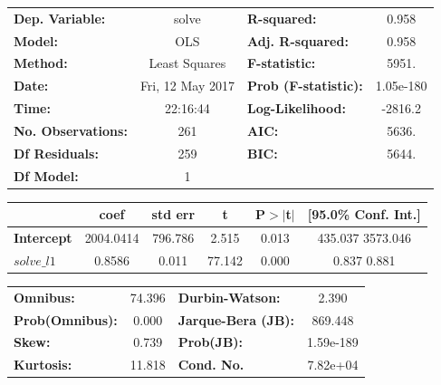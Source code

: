 \documentclass{article}
\begin{document}
\begin{center}
\begin{tabular}{lclc}
\toprule
\textbf{Dep. Variable:}    &      solve       & \textbf{  R-squared:         } &     0.958   \\
\textbf{Model:}            &       OLS        & \textbf{  Adj. R-squared:    } &     0.958   \\
\textbf{Method:}           &  Least Squares   & \textbf{  F-statistic:       } &     5951.   \\
\textbf{Date:}             & Fri, 12 May 2017 & \textbf{  Prob (F-statistic):} & 1.05e-180   \\
\textbf{Time:}             &     22:16:44     & \textbf{  Log-Likelihood:    } &   -2816.2   \\
\textbf{No. Observations:} &         261      & \textbf{  AIC:               } &     5636.   \\
\textbf{Df Residuals:}     &         259      & \textbf{  BIC:               } &     5644.   \\
\textbf{Df Model:}         &           1      & \textbf{                     } &             \\
\bottomrule
\end{tabular}
\begin{tabular}{lccccc}
                   & \textbf{coef} & \textbf{std err} & \textbf{t} & \textbf{P$>$$|$t$|$} & \textbf{[95.0\% Conf. Int.]}  \\
\midrule
\textbf{Intercept} &    2004.0414  &      796.786     &     2.515  &         0.013        &       435.037  3573.046       \\
\textbf{$solve\_l1$}  &       0.8586  &        0.011     &    77.142  &         0.000        &         0.837     0.881       \\
\bottomrule
\end{tabular}
\begin{tabular}{lclc}
\textbf{Omnibus:}       & 74.396 & \textbf{  Durbin-Watson:     } &     2.390  \\
\textbf{Prob(Omnibus):} &  0.000 & \textbf{  Jarque-Bera (JB):  } &   869.448  \\
\textbf{Skew:}          &  0.739 & \textbf{  Prob(JB):          } & 1.59e-189  \\
\textbf{Kurtosis:}      & 11.818 & \textbf{  Cond. No.          } &  7.82e+04  \\
\bottomrule
\end{tabular}
\end{center}
\end{document}
